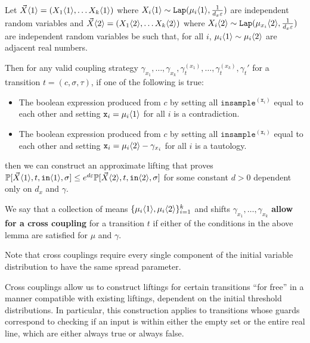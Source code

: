 \begin{lemma}\label{mvCrossCoupling}
    Let $\vec{X}\langle1 \rangle = (X_1\langle1 \rangle, \ldots X_k\langle1 \rangle)$ where $X_i\langle1 \rangle\sim \texttt{Lap}(\mu_i\langle1 \rangle, \frac{1}{d_x\varepsilon})$ are independent random variables and $\vec{X}\langle2 \rangle = (X_1\langle2 \rangle, \ldots X_k\langle2 \rangle)$ where $X_i\langle2 \rangle\sim \texttt{Lap}(\mu_{x_i}\langle2 \rangle, \frac{1}{d_x\varepsilon})$ 
    are independent random variables be such that, for all $i$, $\mu_i\langle1 \rangle\sim \mu_i\langle2 \rangle$ are adjacent real numbers.

    Then for any valid coupling strategy $\gamma_{x_1}, \ldots, \gamma_{x_k}, \gamma_t^{(x_1)}, \ldots, \gamma_t^{(x_k)}, \gamma_t'$ for a transition $t = (c, \sigma,\tau)$, if one of the following is true: \begin{itemize}
        \item The boolean expression produced from $c$ by setting all $\texttt{insample}^{(\texttt{x}_i)}$ equal to each other and setting $\texttt{x}_i = \mu_i\langle1 \rangle$ for all $i$ is a contradiction.
        \item The boolean expression produced from $c$ by setting all $\texttt{insample}^{(\texttt{x}_i)}$ equal to each other and setting $\texttt{x}_i = \mu_i\langle2 \rangle-\gamma_{x_i}$ for all $i$ is a tautology.
    \end{itemize}
    then we can construct an approximate lifting that proves $\mathbb{P}[\vec{X}\langle1 \rangle, t, \texttt{in}\langle1 \rangle, \sigma]\leq e^{d\varepsilon}\mathbb{P}[\vec{X}\langle2 \rangle, t, \texttt{in}\langle2 \rangle, \sigma]$ for some constant $d>0$ dependent only on $d_x$ and $\gamma$. 
\end{lemma}
We say that a collection of means $\{\mu_i\langle1 \rangle, \mu_i\langle2 \rangle\}_{i=1}^k$ and shifts $\gamma_{x_1},\ldots,\gamma_{x_k}$ \textbf{allow for a cross coupling} for a transition $t$ if either of the conditions in the above lemma are satisfied for $\mu$ and $\gamma$. 

Note that cross couplings require every single component of the initial variable distribution to have the same spread parameter.

Cross couplings allow us to construct liftings for certain transitions ``for free'' in a manner compatible with existing liftings, dependent on the initial threshold distributions. In particular, this construction applies to transitions whose guards correspond to checking if an input is within either the empty set or the entire real line, which are either always true or always false. 

